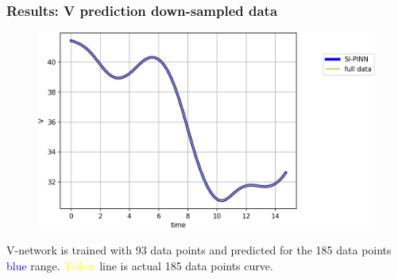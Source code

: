 \begin{frame}
	\frametitle{Results: V prediction down-sampled data}
	\begin{figure}
		\includegraphics[scale=0.5]{supportingFiles/V_comparison.png}
	\end{figure}
	V-network is trained with 93 data points and predicted for the 185 data points
	\textcolor{blue}{blue} range. \textcolor{yellow}{Yellow} line is actual 185 data points curve.
\end{frame}


